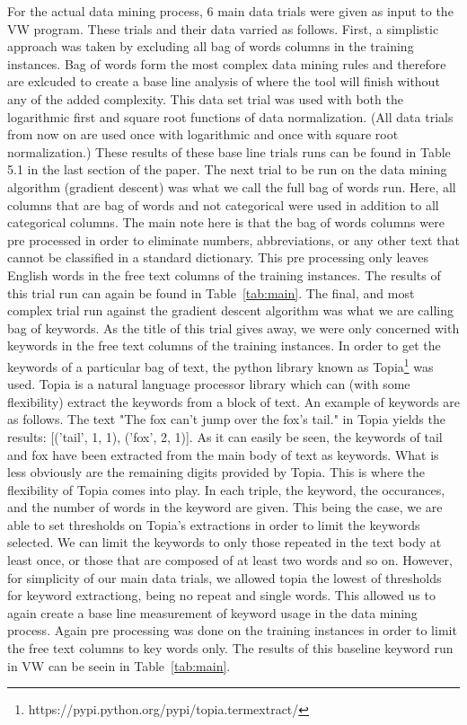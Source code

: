For the actual data mining process, 6 main data trials were given as input to the VW program. These trials and their data varried as
follows. First, a simplistic approach was taken by excluding all bag of words columns in the training instances. Bag of words form
the most complex data mining rules and therefore are exlcuded to create a base line analysis of where the tool will finish without
any of the added complexity. This data set trial was used with both the logarithmic first and square root functions of data normalization.
(All data trials from now on are used once with logarithmic and once with square root normalization.) These results of these base line
trials runs can be found in Table 5.1 in the last section of the paper. The next trial to be run on the data mining algorithm (gradient
descent) was what we call the full bag of words run. Here, all columns that are bag of words and not categorical were used in addition
to all categorical columns. The main note here is that the bag of words columns were pre processed in order to eliminate numbers, 
abbreviations, or any other text that cannot be classified in a standard dictionary. This pre processing only leaves English words
in the free text columns of the training instances. The results of this trial run can again be found in Table~\ref{tab:main}. The 
final, and most complex trial run against the gradient descent algorithm was what we are calling bag of keywords. As the title of
this trial gives away, we were only concerned with keywords in the free text columns of the training instances. In order to
get the keywords of a particular bag of text, the python library known as Topia\footnote{https://pypi.python.org/pypi/topia.termextract/}
was used. Topia is a natural language processor library which can (with some flexibility) extract the keywords from a block of text.
An example of keywords are as follows. The text "The fox can't jump over the fox's tail." in Topia yields the results:
[('tail', 1, 1), ('fox', 2, 1)]. As it can easily be seen, the keywords of tail and fox have been extracted from the main body of
text as keywords. What is less obviously are the remaining digits provided by Topia. This is where the flexibility of Topia comes into
play. In each triple, the keyword, the occurances, and the number of words in the keyword are given. This being the case, we are
able to set thresholds on Topia's extractions in order to limit the keywords selected. We can limit the keywords to only those
repeated in the text body at least once, or those that are composed of at least two words and so on. However, for simplicity of
our main data trials, we allowed topia the lowest of thresholds for keyword extractiong, being no repeat and single words. This
allowed us to again create a base line measurement of keyword usage in the data mining process. Again pre processing was done on
the training instances in order to limit the free text columns to key words only. The results of this baseline keyword run
in VW can be seein in Table~\ref{tab:main}.
